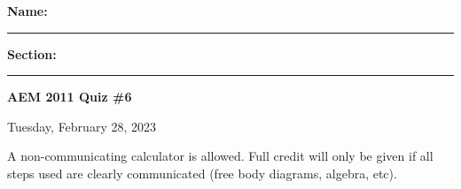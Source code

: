 \documentclass{article}
\begin{document}

\vspace{.5cm}
\noindent
\textbf{Name: }\rule{5cm}{0.4pt}\hspace{.5cm}
\textbf{Section: }\rule{1cm}{0.4pt}
\hfill\textbf{AEM 2011 Quiz \#6}

\noindent
\hfill Tuesday, February 28, 2023
\vspace{1cm}
\noindent

\vspace{.3cm}

\noindent A non-communicating calculator is allowed.  Full credit will only be given if all steps used are clearly communicated (free body diagrams, algebra, etc).

\vspace{0.5cm}






\end{document}
